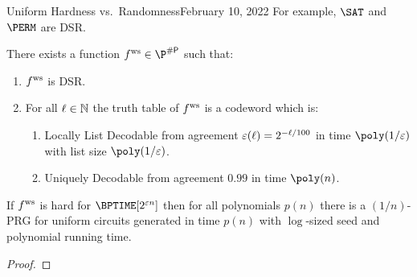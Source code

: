 \begin{lecture}{4}{Uniform Hardness vs.\ Randomness}{February 10, 2022}
For example, $\SAT$ and $\PERM$ are DSR.

\begin{proposition}
	There exists a function $\fws \in \P^{\sharpp}$ such that:
	\begin{enumerate}
		\item $ f^{\text{ws}} $ is DSR.
		\item For all $\ell \in \mathbb{N}$ the truth table of $ f^{\text{ws}} $ is a codeword
			which is:
			\begin{enumerate}
        \item Locally List Decodable from agreement $\varepsilon(\ell) = 2^{-\ell /
          100}$ in time $\poly(1/\eps)$ with list size $\poly(1 / \eps)$.
        \item Uniquely Decodable from agreement $0.99$ in time $\poly(n)$.
			\end{enumerate}
	\end{enumerate}
\end{proposition}

\begin{theorem}
  If $ f^{\text{ws}} $ is hard for $\BPTIME\brac{2^{\eps n}}$ then for all polynomials
  $p(n)$ there is a $(1 / n)$-PRG for uniform circuits generated in time $p(n)$
  with $\log$-sized seed and polynomial running time.
\end{theorem}

\begin{proof}
\end{proof}

\end{lecture}
